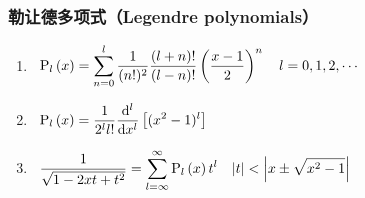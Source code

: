 \documentclass[12pt,a4paper]{article}
\newcommand\dif{\mathrm{d}}
\renewcommand{\[}{\ $\displaystyle}
\renewcommand{\]}{$\ }%
\newcommand{\summ}[2][n]{\sum_{#1=#2}^\infty}
\begin{document}
	  \subsubsection{勒让德多项式（Legendre polynomials）}
		\begin{enumerate}
			\item \[
		 	  \fp{x} = \sum_{n=0}^l \frac{1}{(n!)^2}\frac{(l+n)!}{(l-n)!}\left(\frac{x-1}2\right)^n \quad l = 0,1,2,\cdots
		 	\]
		 	\item \[
		 	  \fp{x} = \frac{1}{2^l l!}\frac{\dif^l}{\dif x^l}\left[(x^2 - 1)^l\right]
		 	\]
		 	\item \[
		 		  \frac{1}{\sqrt{1 - 2xt + t^2}} = \summ[l]{\infty} \fp{x}t^l \quad |t|<\left| x \pm \sqrt{x^2 -1}\right|
		 		\]
		\end{enumerate}
		
\end{document}

